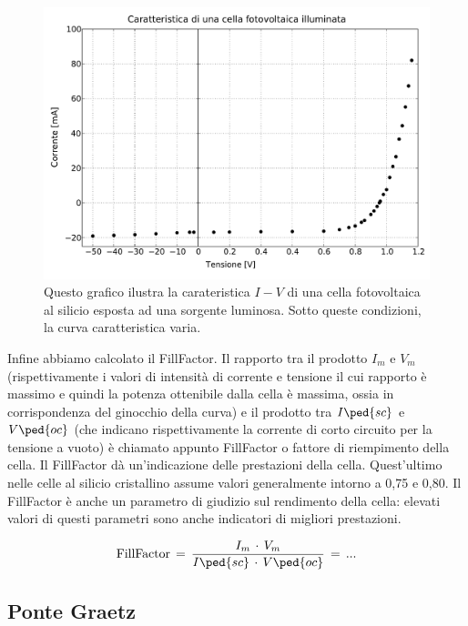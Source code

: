 \begin{figure}
    \includegraphics[scale=0.5]{luce.pdf}
    \caption{Questo grafico ilustra la carateristica $I-V$ di una cella fotovoltaica al silicio esposta ad una sorgente luminosa. Sotto queste condizioni, la curva caratteristica varia.}
    \label{fig:luce}
\end{figure}

Infine abbiamo calcolato il FillFactor. Il rapporto tra il prodotto $I_m$ e $V_m$ (rispettivamente i valori di intensità di corrente e tensione il cui rapporto è massimo e quindi la potenza ottenibile dalla cella è massima, ossia in corrispondenza del ginocchio della curva) e il prodotto tra $I\ped{sc}$ e $V\ped{oc}$ (che indicano rispettivamente la corrente di corto circuito per la tensione a vuoto) è chiamato appunto FillFactor o fattore di riempimento della cella.
Il FillFactor dà un’indicazione delle prestazioni della cella.
Quest’ultimo nelle celle al silicio cristallino assume valori generalmente intorno a 0,75 e 0,80. Il FillFactor è anche un parametro di giudizio sul rendimento della cella: elevati valori di questi parametri sono anche indicatori di migliori prestazioni.

\begin{equation}
	\text{FillFactor} \,=\, \frac{I_m\,\cdot\,V_m}{I\ped{sc}\,\cdot\,V\ped{oc}} \,=\, ...
\end{equation}

\subsection{Ponte Graetz}

